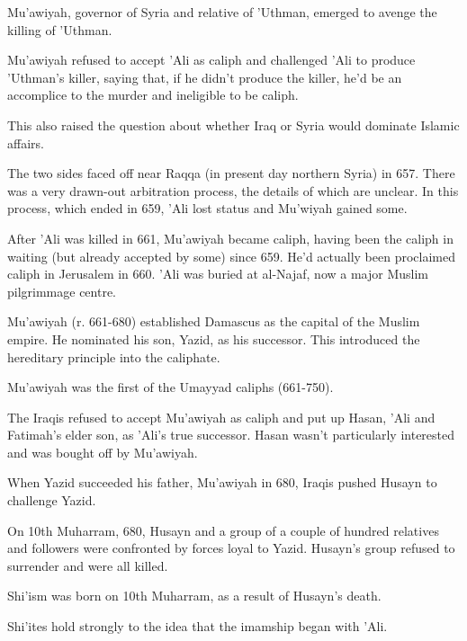 \documentclass[
]{book}
\begin{document}
Mu'awiyah, governor of Syria and relative of 'Uthman, emerged to avenge
the killing of 'Uthman.

Mu'awiyah refused to accept 'Ali as caliph and challenged 'Ali to
produce 'Uthman's killer, saying that, if he didn't produce the killer,
he'd be an accomplice to the murder and ineligible to be caliph.

This also raised the question about whether Iraq or Syria would dominate
Islamic affairs.

The two sides faced off near Raqqa (in present day northern Syria) in
657. There was a very drawn-out arbitration process, the details of
which are unclear. In this process, which ended in 659, 'Ali lost status
and Mu'wiyah gained some.

After 'Ali was killed in 661, Mu'awiyah became caliph, having been the
caliph in waiting (but already accepted by some) since 659. He'd
actually been proclaimed caliph in Jerusalem in 660. 'Ali was buried at
al-Najaf, now a major Muslim pilgrimmage centre.

Mu'awiyah (r. 661-680) established Damascus as the capital of the Muslim
empire. He nominated his son, Yazid, as his successor. This introduced
the hereditary principle into the caliphate.

Mu'awiyah was the first of the Umayyad caliphs (661-750).

The Iraqis refused to accept Mu'awiyah as caliph and put up Hasan, 'Ali
and Fatimah's elder son, as 'Ali's true successor. Hasan wasn't
particularly interested and was bought off by Mu'awiyah.

When Yazid succeeded his father, Mu'awiyah in 680, Iraqis pushed Husayn
to challenge Yazid.

On 10th Muharram, 680, Husayn and a group of a couple of hundred
relatives and followers were confronted by forces loyal to Yazid.
Husayn's group refused to surrender and were all killed.

Shi'ism was born on 10th Muharram, as a result of Husayn's death.

Shi'ites hold strongly to the idea that the imamship began with 'Ali.

\backmatter
\end{document}
